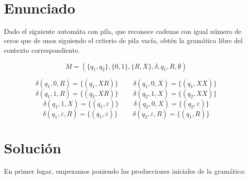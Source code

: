 \documentclass[10pt,a4paper,spanish]{report}
\begin{document}
\newpage
\thispagestyle{empty}

\\[2.5cm]
\section{\textcolor{p4}Enunciado}
Dado el siguiente automáta con pila, que reconoce cadenas con igual número de ceros que de unos siguiendo el criterio de pila vacía, obtén la gramática libre del contexto correspondiente.

\begin{displaymath}
  M = (\{q_1,q_2\},\{0,1\},\{R,X\},\delta,q_1,R,\emptyset)
\end{displaymath}

\begin{displaymath}
  \delta(q_1,0,R) = \{(q_1,XR)\} \qquad\ \delta(q_1,0,X) = \{(q_1,XX)\}
\end{displaymath}
\begin{displaymath}
  \delta(q_1,1,R) = \{(q_2,XR)\} \qquad\ \delta(q_2,1,X) = \{(q_2,XX)\}
\end{displaymath}
\begin{displaymath}
  \delta(q_1,1,X) = \{(q_1,\varepsilon)\} \qquad\ \delta(q_2,0,X) = \{(q_2,\varepsilon)\}
\end{displaymath}
\begin{displaymath}
  \delta(q_1,\varepsilon,R) = \{(q_1,\varepsilon)\} \qquad\ \delta(q_2,\varepsilon,R) = \{(q_1,R)\}
\end{displaymath}

\section{\textcolor{p4}Solución}
En primer lugar, empezamos poniendo las producciones iniciales de la gramática:
\end{document}
